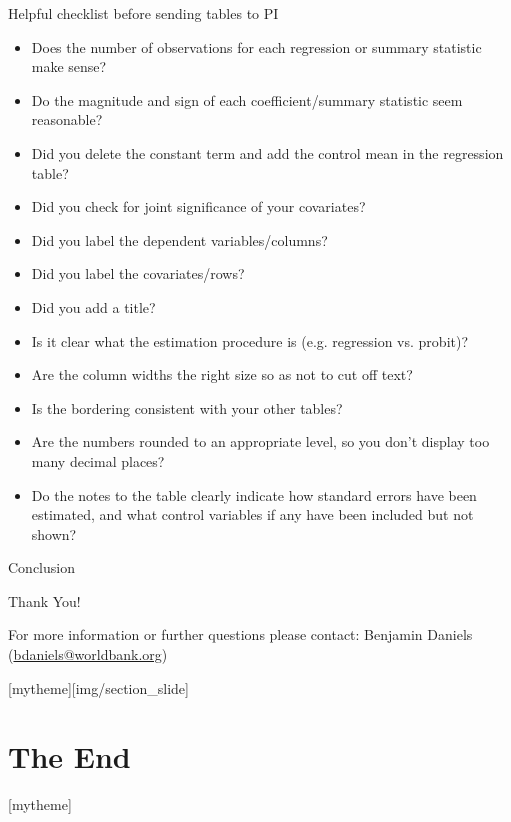 \documentclass[aspectratio=169]{beamer}
\newcommand{\sectionpic}[2]{
	\setbeamertemplate{section page}[mytheme][#2]
	\section{#1}
	\setbeamertemplate{section page}[mytheme]
}
\begin{document}
\begin{frame}{Helpful checklist before sending tables to PI}
	\begin{multicols}{2}	
		
		\begin{itemize}[<default overlay specification>]
			\item<1> Does the number of observations for each regression or summary statistic make sense?
			\item<1> Do the magnitude and sign of each coefficient/summary statistic seem reasonable?
			\item<1> Did you delete the constant term and add the control mean in the regression table?
			\item<1> Did you check for joint significance of your covariates?
			\item<1> Did you label the dependent variables/columns?
			\item<1> Did you label the covariates/rows?
			\item<1> Did you add a title?
			\item<1> Is it clear what the estimation procedure is (e.g. regression vs. probit)?
			\item<1> Are the column widths the right size so as not to cut off text?
			\item<1> Is the bordering consistent with your other tables?
			\item<1> Are the numbers rounded to an appropriate level, so you don’t display too many decimal places?
			\item<1> Do the notes to the table clearly indicate how standard errors have been estimated, and what control variables if any have been included but not shown?
		\end{itemize}
		
	\end{multicols}
\end{frame}

\begin{frame}{Conclusion}

Thank You!

\vspace{20mm}
For more information or further questions please contact:
\newline Benjamin Daniels  (\url{bdaniels@worldbank.org}) 

\end{frame}

\sectionpic{The End}{img/section_slide}
\end{document}
